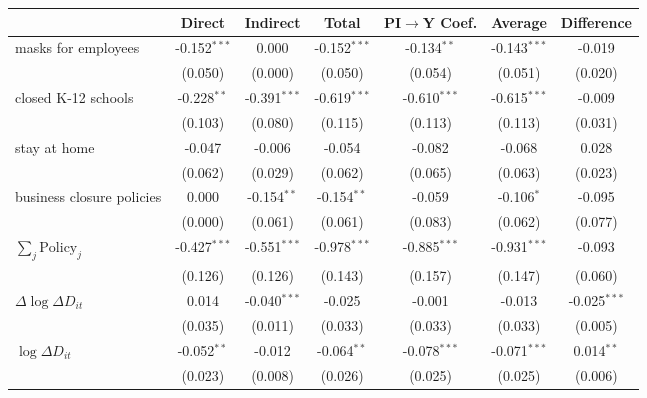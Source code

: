
\begin{tabular}{lccccc|>{}c}
\toprule
  & Direct & Indirect & Total & PI$\to$Y Coef. & Average & Difference\\
\midrule
masks for employees & -0.152$^{***}$ & 0.000 & -0.152$^{***}$ & -0.134$^{**}$ & -0.143$^{***}$ & -0.019\\
 & (0.050) & (0.000) & (0.050) & (0.054) & (0.051) & (0.020)\\
closed K-12 schools & -0.228$^{**}$ & -0.391$^{***}$ & -0.619$^{***}$ & -0.610$^{***}$ & -0.615$^{***}$ & -0.009\\
 & (0.103) & (0.080) & (0.115) & (0.113) & (0.113) & (0.031)\\
stay at home & -0.047 & -0.006 & -0.054 & -0.082 & -0.068 & 0.028\\
 & (0.062) & (0.029) & (0.062) & (0.065) & (0.063) & (0.023)\\
business closure policies & 0.000 & -0.154$^{**}$ & -0.154$^{**}$ & -0.059 & -0.106$^{*}$ & -0.095\\
 & (0.000) & (0.061) & (0.061) & (0.083) & (0.062) & (0.077)\\
$\sum_j \mathrm{Policy}_j$ & -0.427$^{***}$ & -0.551$^{***}$ & -0.978$^{***}$ & -0.885$^{***}$ & -0.931$^{***}$ & -0.093\\
 & (0.126) & (0.126) & (0.143) & (0.157) & (0.147) & (0.060)\\
$\Delta \log \Delta D_{it}$ & 0.014 & -0.040$^{***}$ & -0.025 & -0.001 & -0.013 & -0.025$^{***}$\\
 & (0.035) & (0.011) & (0.033) & (0.033) & (0.033) & (0.005)\\
$\log \Delta D_{it}$ & -0.052$^{**}$ & -0.012 & -0.064$^{**}$ & -0.078$^{***}$ & -0.071$^{***}$ & 0.014$^{**}$\\
 & (0.023) & (0.008) & (0.026) & (0.025) & (0.025) & (0.006)\\
\bottomrule
\end{tabular}